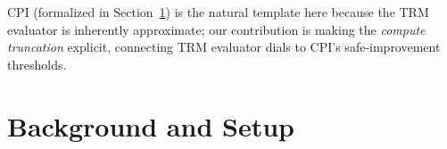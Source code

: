 \documentclass{article}
\theoremstyle{plain}
\theoremstyle{definition}
\theoremstyle{remark}
\newcommand{\longonly}[1]{}
\newcommand{\longonly}[1]{#1}
\begin{document}
CPI (formalized in Section~\ref{sec:setup}) is the natural template here because the TRM evaluator is inherently approximate; our contribution is making the \emph{compute truncation} explicit, connecting TRM evaluator dials to CPI's safe-improvement thresholds.

\longonly{
\textbf{Positioning.}
Our plan-space MDP framing connects to learning-to-search~\citep{Daume2009SEARN,Ross2011DAgger,Chang2015LOLS} and RL with verifiable rewards, while our stability analysis builds on CPI and trust-region ideas~\citep{KakadeLangford2002,Schulman2015TRPO}.}

\section{Background and Setup}
\label{sec:setup}
\end{document}
